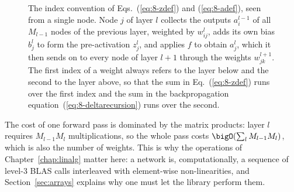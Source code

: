 \begin{figure}[htbp]
\centering
{}
\caption{The index convention of Eqs.~(\ref{eq:8-zdef}) and (\ref{eq:8-adef}),
seen from a single node.  Node $j$ of layer $l$ collects the outputs
$a_i^{l-1}$ of all $M_{l-1}$ nodes of the previous layer, weighted by
$w_{ij}^{l}$, adds its own bias $b_j^{l}$ to form the pre-activation
$z_j^{l}$, and applies $f$ to obtain $a_j^{l}$, which it then sends on to every
node of layer $l+1$ through the weights $w_{jk}^{l+1}$.  The first index of a
weight always refers to the layer below and the second to the layer above, so
that the sum in Eq.~(\ref{eq:8-zdef}) runs over the first index and the sum in
the backpropagation equation~(\ref{eq:8-deltarecursion}) runs over the second.}
\label{fig:8-node}
\end{figure}

The cost of one forward pass is dominated by the matrix products: layer $l$
requires $M_{l-1}M_l$ multiplications, so the whole pass costs
$\bigO\!\left(\sum_l M_{l-1}M_l\right)$, which is also the number of weights.
This is why the operations of Chapter~\ref{chap:linalg} matter here: a network
is, computationally, a sequence of level-3 BLAS calls interleaved with
element-wise non-linearities, and Section~\ref{sec:arrays} explains why one
must let the library perform them.

